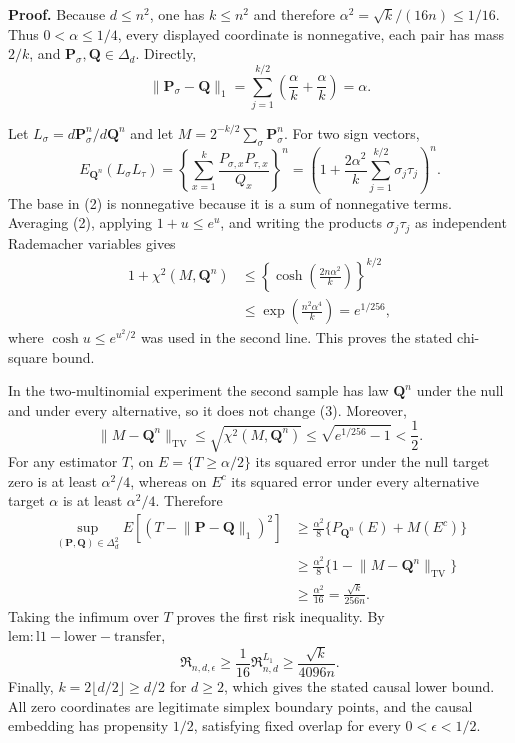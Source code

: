 \textbf{Proof.}
Because \(d\leq n^2\), one has \(k\leq n^2\) and therefore
\(\alpha^2=\sqrt{k}/(16n)\leq1/16\).  Thus \(0<\alpha\leq1/4\), every displayed coordinate is nonnegative, each pair has mass \(2/k\), and \(\mathbf P_\sigma,\mathbf Q\in\Delta_d\).  Directly,
\[
 \lVert\mathbf P_\sigma-\mathbf Q\rVert_1
 =\sum_{j=1}^{k/2}\left(\frac\alpha k+\frac\alpha k\right)
 =\alpha.
 \tag{1}
\]

Let \(L_\sigma=d\mathbf P_\sigma^n/d\mathbf Q^n\) and let
\(M=2^{-k/2}\sum_\sigma\mathbf P_\sigma^n\).  For two sign vectors,
\[
 E_{\mathbf Q^n}(L_\sigma L_\tau)
 =\left\{
   \sum_{x=1}^k\frac{P_{\sigma,x}P_{\tau,x}}{Q_x}
  \right\}^n
 =\left(1+\frac{2\alpha^2}{k}
       \sum_{j=1}^{k/2}\sigma_j\tau_j\right)^n.
 \tag{2}
\]
The base in (2) is nonnegative because it is a sum of nonnegative terms.  Averaging (2), applying \(1+u\leq e^u\), and writing the products \(\sigma_j\tau_j\) as independent Rademacher variables gives
\[
 \begin{aligned}
 1+\chi^2(M,\mathbf Q^n)
 &\leq\left\{\cosh\!\left(
       \frac{2n\alpha^2}{k}
      \right)\right\}^{k/2}\\
 &\leq\exp\!\left(\frac{n^2\alpha^4}{k}\right)
 =e^{1/256},
 \end{aligned}
 \tag{3}
\]
where \(\cosh u\leq e^{u^2/2}\) was used in the second line.  This proves the stated chi-square bound.

In the two-multinomial experiment the second sample has law \(\mathbf Q^n\) under the null and under every alternative, so it does not change (3).  Moreover,
\[
 \lVert M-\mathbf Q^n\rVert_{\mathrm{TV}}
 \leq\sqrt{\chi^2(M,\mathbf Q^n)}
 \leq\sqrt{e^{1/256}-1}<\frac12.
 \tag{4}
\]
For any estimator \(T\), on \(E=\{T\geq\alpha/2\}\) its squared error under the null target zero is at least \(\alpha^2/4\), whereas on \(E^c\) its squared error under every alternative target \(\alpha\) is at least \(\alpha^2/4\).  Therefore
\[
 \begin{aligned}
 \sup_{(\mathbf P,\mathbf Q)\in\Delta_d^2}
 E[(T-\lVert\mathbf P-\mathbf Q\rVert_1)^2]
 &\geq\frac{\alpha^2}{8}
   \{P_{\mathbf Q^n}(E)+M(E^c)\}\\
 &\geq\frac{\alpha^2}{8}
   \{1-\lVert M-\mathbf Q^n\rVert_{\mathrm{TV}}\}\\
 &\geq\frac{\alpha^2}{16}
 =\frac{\sqrt{k}}{256n}.
 \end{aligned}
\]
Taking the infimum over \(T\) proves the first risk inequality.  By
\(\mathrm{lem:l1-lower-transfer}\),
\[
 \mathfrak R_{n,d,\epsilon}
 \geq\frac1{16}\mathfrak R^{L_1}_{n,d}
 \geq\frac{\sqrt{k}}{4096n}.
\]
Finally, \(k=2\lfloor d/2\rfloor\geq d/2\) for \(d\geq2\), which gives the stated causal lower bound.  All zero coordinates are legitimate simplex boundary points, and the causal embedding has propensity \(1/2\), satisfying fixed overlap for every \(0<\epsilon<1/2\).